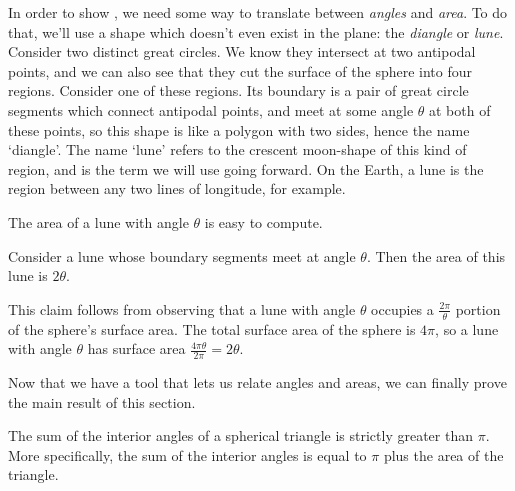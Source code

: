 In order to  show , we need some way to translate between \textit{angles} and \textit{area}.  To do that, we'll use a shape which doesn't even exist in the plane: the \textit{diangle} or \textit{lune}.  Consider two distinct great circles.  We know they intersect at two antipodal points, and we can also see that they cut the surface of the sphere into four regions.  Consider one of these regions.  Its boundary is a pair of great circle segments which connect antipodal points, and meet at some angle $\theta$ at both of these points, so this shape is like a polygon with two sides, hence the name `diangle'.  The name `lune' refers to the crescent moon-shape of this kind of region, and is the term we will use going forward.  On the Earth, a lune is the region between any two lines of longitude, for example.

The area of a lune with angle $\theta$ is easy to compute.

\begin{claim}
	Consider a lune whose boundary segments meet at angle $\theta$.  Then the area of this lune is $2\theta$.
\end{claim}

This claim follows from observing that a lune with angle $\theta$ occupies a $\tfrac{2\pi}{\theta}$ portion of the sphere's surface area.  The total surface area of the sphere is $4\pi$, so a lune with angle $\theta$ has surface area $\tfrac{4\pi\theta}{2\pi}= 2\theta$.


Now that we have a tool that lets us relate angles and areas, we can finally prove the main result of this section.






	



\begin{lemma}\label{lem:sphtri}
	
The sum of the interior angles of a spherical triangle is strictly greater than $\pi$.  More specifically, the sum of the interior angles is equal to $\pi$ plus the area of the triangle.
\end{lemma}

